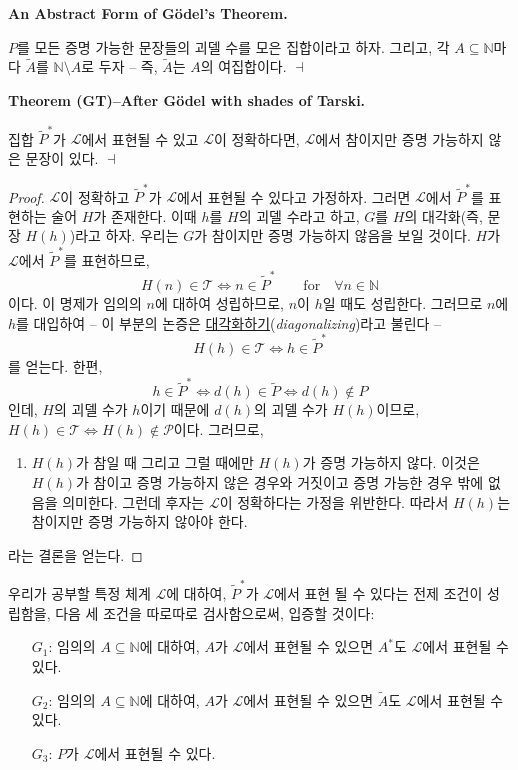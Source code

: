 \documentclass[12pt]{paper}
\newenvironment{context}[1][]
{ \noindent \textbf{{#1}.}
}
{ \hfill $ \dashv $
}
\begin{document}
\begin{context}[An Abstract Form of G\"odel's Theorem]
$P$를 모든 증명 가능한 문장들의 괴델 수를 모은 집합이라고 하자.
그리고, 각 $A \subseteq \mathbb{N}$마다 $\tilde{A}$를 $\mathbb{N} \setminus A$로 두자 --
즉, $\tilde{A}$는 $A$의 여집합이다.
\end{context}

\begin{context}[Theorem (GT)--After G\"odel with shades of Tarski]
집합 $\tilde{P}^{*}$가 $\mathcal{L}$에서 표현될 수 있고 $\mathcal{L}$이 정확하다면,
$\mathcal{L}$에서 참이지만 증명 가능하지 않은 문장이 있다.
\end{context}

\begin{proof}
$\mathcal{L}$이 정확하고 $\tilde{P}^{*}$가 $\mathcal{L}$에서 표현될 수 있다고 가정하자.
그러면 $\mathcal{L}$에서 $\tilde{P}^{*}$를 표현하는 술어 $H$가 존재한다.
이때 $h$를 $H$의 괴델 수라고 하고,
$G$를 $H$의 대각화(즉, 문장 $ H \left( h \right) $)라고 하자.
우리는 $G$가 참이지만 증명 가능하지 않음을 보일 것이다.
$H$가 $\mathcal{L}$에서 $\tilde{P}^{*}$를 표현하므로,
$$ H \left( n \right) \in \mathcal{T} \iff n \in \tilde{P}^{*} \qquad \mathrm{for} \quad \forall n \in \mathbb{N} $$이다.
이 명제가 임의의 $n$에 대하여 성립하므로,
$n$이 $h$일 때도 성립한다.
그러므로 $n$에 $h$를 대입하여 --
이 부분의 논증은 \underline{대각화하기}(\textit{diagonalizing})라고 불린다 --
$$ H \left( h \right) \in \mathcal{T} \iff h \in \tilde{P}^{*}$$를 얻는다.
한편, $$h \in \tilde{P}^{*} \iff d \left( h \right) \in \tilde{P} \iff d \left( h \right) \notin P$$인데,
$H$의 괴델 수가 $h$이기 때문에 $d \left( h \right)$의 괴델 수가 $H \left( h \right)$이므로,
$ H \left( h \right) \in \mathcal{T} \iff H \left( h \right) \notin \mathcal{P}$이다.
그러므로,
\begin{enumerate}
\item $H \left( h \right)$가 참일 때 그리고 그럴 때에만 $H \left( h \right)$가 증명 가능하지 않다.
이것은 $H \left( h \right)$가 참이고 증명 가능하지 않은 경우와 거짓이고 증명 가능한 경우 밖에 없음을 의미한다.
그런데 후자는 $\mathcal{L}$이 정확하다는 가정을 위반한다.
따라서 $H \left( h \right)$는 참이지만 증명 가능하지 않아야 한다.
\end{enumerate}
라는 결론을 얻는다.
\end{proof}

우리가 공부할 특정 체계 $\mathcal{L}$에 대하여,
$\tilde{P}^{*}$가 $\mathcal{L}$에서 표현 될 수 있다는 전제 조건이 성립함을,
다음 세 조건을 따로따로 검사함으로써, 입증할 것이다:
\begin{itemize}
\item[$G_1$:] 임의의 $A \subseteq \mathbb{N}$에 대하여, $A$가 $\mathcal{L}$에서 표현될 수 있으면 $A^{*}$도 $\mathcal{L}$에서 표현될 수 있다.
\item[$G_2$:] 임의의 $A \subseteq \mathbb{N}$에 대하여, $A$가 $\mathcal{L}$에서 표현될 수 있으면 $\tilde{A}$도 $\mathcal{L}$에서 표현될 수 있다.
\item[$G_3$:] $P$가 $\mathcal{L}$에서 표현될 수 있다.
\end{itemize}
\end{document}
